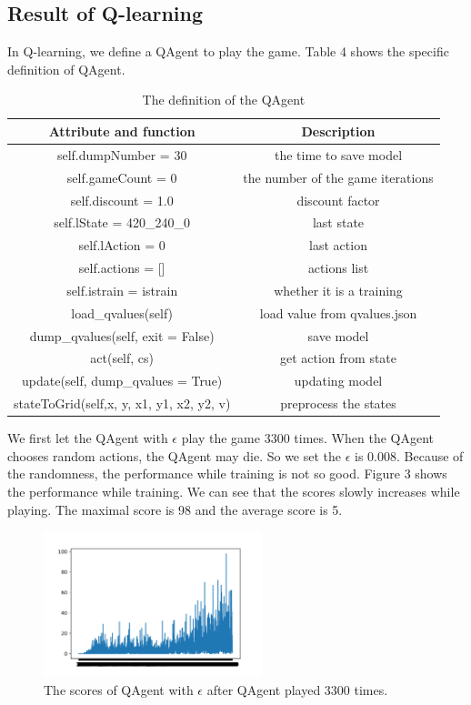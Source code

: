 \documentclass[conference,compsoc]{IEEEtran}
\begin{document}
\subsection{Result of Q-learning}
\indent In Q-learning, we define a QAgent to play the game. Table 4 shows the specific definition of QAgent.

\begin{table}[!t]
\renewcommand{\arraystretch}{1.3}
\caption{The definition of the QAgent}
\label{table_4}
\centering
\begin{tabular}{|c|c|}
\hline
Attribute and function & Description\\
\hline
self.dumpNumber = 30& the time to save model\\
\hline
self.gameCount = 0 & the number of the game iterations\\
\hline
self.discount = 1.0 & discount factor\\
\hline
self.lState = 420\_240\_0 & last state\\
\hline
self.lAction = 0 & last action\\
\hline
self.actions = [] & actions list\\
\hline
self.istrain = istrain & whether it is a training\\
\hline
load\_qvalues(self) & load value from qvalues.json\\
\hline
dump\_qvalues(self, exit = False) & save model\\
\hline
act(self, cs) & get action from state\\
\hline
update(self, dump\_qvalues = True) & updating model\\
\hline
stateToGrid(self,x, y, x1, y1, x2, y2, v) &preprocess the states\\
\hline
\end{tabular}
\end{table}

\indent We first let the QAgent with ${\epsilon}$  play the game 3300 times. When the QAgent chooses random actions, the QAgent may die. So we set the ${\epsilon}$  is 0.008. Because of the randomness, the performance while training is not so good. Figure 3 shows the performance while training. We can see that the scores slowly increases while playing. The maximal score is 98 and the average score is 5.

\begin{figure}[!t]
\centering
\includegraphics[width=2.5in]{Qlearn_Ep_result.png}
\caption{The scores of QAgent with ${\epsilon}$ after QAgent played 3300 times.}
\label{fig3}
\end{figure}
\end{document}
